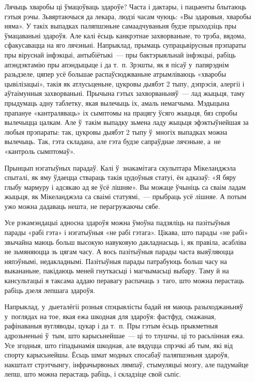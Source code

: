 Лячыць хваробы ці ўмацоўваць здароўе? Часта і дактары, і пацыенты блытаюць гэтыя рэчы. Зьвяртаючыся да лекара, людзі часам чуюць: «Вы здаровыя, хваробы няма». У такіх выпадках паляпшэньне самаадчуваньня будзе прыходзіць пры ўмацаваньні здароўя. Але калі ёсьць канкрэтнае захворваньне, то трэба, вядома, сфакусавацца на яго лячэньні. Напрыклад, прымаць супрацьвірусныя прэпараты пры віруснай інфэкцыі, антыбіётыкі~--- пры бактэрыяльнай інфэкцыі, рабіць апэндэктамію пры апэндыцыце і да т.~п. Зрэшты, як я пісаў у~папярэднім разьдзеле, цяпер усё большае распаўсюджваньне атрымліваюць «хваробы цывілізацыі», такія як атлусьценьне, цукровы дыябэт 2 тыпу, дэпрэсія, алергіі і аўтаімунныя захворваньні. Прычына гэтых захворваньняў~--- лад жыцьця, таму прыдумаць адну таблетку, якая вылечыць іх, амаль немагчыма. Мэдыцына прапануе «кантраляваць» іх сымптомы на працягу ўсяго жыцьця, бяз спробы вылечыцца цалкам. Але ў~такім выпадку зьмена ладу жыцьця эфэктыўнейшая за любыя прэпараты: так, цукровы дыябэт 2 тыпу ў~многіх выпадках можна вылечыць. Так, гэта складана, але гэта будзе сапраўднае лячэньне, а~не «кантроль сымптомаў».

Прынцып нэгатыўных парадаў. Калі ў~знакамітага скульптара Мікеланджэла спыталі, як яму ўдаецца ствараць такія цудоўныя статуі, ён адказаў: «Я бяру глыбу мармуру і адсякаю ад яе ўсё лішняе». Вы можаце ўчыніць са сваім ладам жыцьця, як Мікеланджэла са сваімі статуямі,~--- прыбраць усё лішняе. А потым ужо можна дадаваць нешта, не перагружаючы сябе.

Усе рэкамэндацыі адносна здароўя можна ўмоўна падзяліць на пазітыўныя парады «рабі гэта» і нэгатыўныя «не рабі гэтага». Цікава, што парады «не рабі» звычайна маюць больш высокую навуковую дакладнасьць і, як правіла, асабліва не зьмяняюцца зь цягам часу. А вось пазітыўныя парады часта выяўляюцца няпэўнымі, недакладнымі. Пазітыўныя парады патрабуюць больш часу на выкананьне, пакідаюць меней гнуткасьці і магчымасьці выбару. Таму й на кансультацыі я таксама аддаю перавагу распачаць з~таго, што можна перастаць рабіць дзеля лепшага здароўя.

Напрыклад, у~дыеталёгіі розныя спэцыялісты бадай ня маюць разыходжаньняў у~поглядах на тое, якая ежа шкодная для здароўя: фастфуд, смажаная, рафінаваныя вугляводы, цукар і да т.~п. Пры гэтым ёсьць прыкметныя адрозьненьні ў~тым, што карысьнейшае~--- ці то тлушчы, ці то расьлінная ежа. Усе згодныя, што гіпадынамія шкодная, але вядуцца спрэчкі аб тым, які від спорту карысьнейшы. Ёсьць шмат модных спосабаў паляпшэньня здароўя, накшталт стрэтчынгу, інфрачырвоных лямпаў, стымуляцыі мозгу, але падумайце лепш, што можна перастаць рабіць, і складзіце свой сьпіс.

